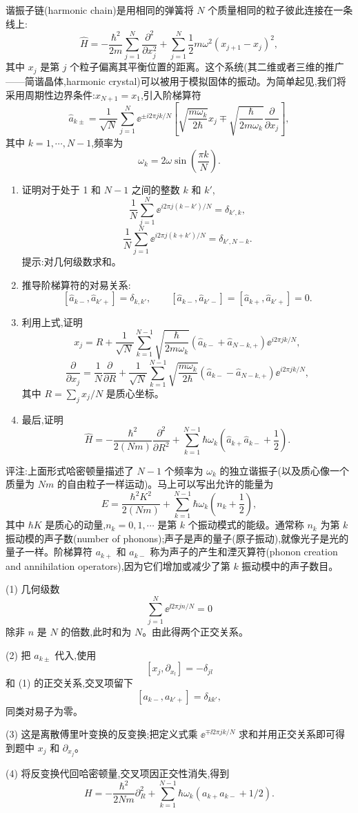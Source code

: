 \begin{question}
谐振子链(harmonic chain)是用相同的弹簧将 $N$ 个质量相同的粒子彼此连接在一条线上:
\[
\hat H=-\frac{\hbar^2}{2m}\sum_{j=1}^{N}\frac{\partial^2}{\partial x_j^2}
+\sum_{j=1}^{N}\frac12 m\omega^2(x_{j+1}-x_j)^2,
\]
其中 $x_j$ 是第 $j$ 个粒子偏离其平衡位置的距离。这个系统(其二维或者三维的推广——简谐晶体,harmonic crystal)可以被用于模拟固体的振动。为简单起见,我们将采用周期性边界条件:$x_{N+1}=x_1$,引入阶梯算符
\[
\hat a_{k\pm}=\frac{1}{\sqrt N}\sum_{j=1}^{N}\ee^{\pm i2\pi jk/N}\left[\sqrt{\frac{m\omega_k}{2\hbar}}x_j\mp\sqrt{\frac{\hbar}{2m\omega_k}}\frac{\partial}{\partial x_j}\right],
\]
其中 $k=1,\cdots,N-1$,频率为
\[
\omega_k=2\omega\sin\left(\frac{\pi k}{N}\right).
\]
\begin{enumerate}
\item 证明对于处于 1 和 $N-1$ 之间的整数 $k$ 和 $k'$,
\[
\frac{1}{N}\sum_{j=1}^{N}\ee^{i2\pi j(k-k')/N}=\delta_{k',k},
\]
\[
\frac{1}{N}\sum_{j=1}^{N}\ee^{i2\pi j(k+k')/N}=\delta_{k',N-k}.
\]
提示:对几何级数求和。
\item 推导阶梯算符的对易关系:
\[
[\hat a_{k-},\hat a_{k'+}]=\delta_{k,k'},\qquad
[\hat a_{k-},\hat a_{k'-}]=[\hat a_{k+},\hat a_{k'+}]=0.
\]
\item 利用上式,证明
\[
x_j=R+\frac{1}{\sqrt N}\sum_{k=1}^{N-1}\sqrt{\frac{\hbar}{2m\omega_k}}(\hat a_{k-}+\hat a_{N-k,+})\ee^{i2\pi jk/N},
\]
\[
\frac{\partial}{\partial x_j}=\frac{1}{N}\frac{\partial}{\partial R}+\frac{1}{\sqrt N}\sum_{k=1}^{N-1}\sqrt{\frac{m\omega_k}{2\hbar}}(\hat a_{k-}-\hat a_{N-k,+})\ee^{i2\pi jk/N},
\]
其中 $R=\sum_j x_j/N$ 是质心坐标。
\item 最后,证明
\[
\hat H=-\frac{\hbar^2}{2(Nm)}\frac{\partial^2}{\partial R^2}+\sum_{k=1}^{N-1}\hbar\omega_k\left(\hat a_{k+}\hat a_{k-}+\frac12\right).
\]
\end{enumerate}
评注:上面形式哈密顿量描述了 $N-1$ 个频率为 $\omega_k$ 的独立谐振子(以及质心像一个质量为 $Nm$ 的自由粒子一样运动)。马上可以写出允许的能量为
\[
E=\frac{\hbar^2K^2}{2(Nm)}+\sum_{k=1}^{N-1}\hbar\omega_k\left(n_k+\frac12\right),
\]
其中 $\hbar K$ 是质心的动量,$n_k=0,1,\cdots$ 是第 $k$ 个振动模式的能级。通常称 $n_k$ 为第 $k$ 振动模的声子数(number of phonons);声子是声的量子(原子振动),就像光子是光的量子一样。阶梯算符 $a_{k+}$ 和 $a_{k-}$ 称为声子的产生和湮灭算符(phonon creation and annihilation operators),因为它们增加或减少了第 $k$ 振动模中的声子数目。
\begin{solution}

(1) 几何级数
\[
\sum_{j=1}^N\ee^{\ii2\pi jn/N}=0
\]
除非 $n$ 是 $N$ 的倍数,此时和为 $N$。由此得两个正交关系。

(2) 把 $a_{k\pm}$ 代入,使用
\[
[x_j,\partial_{x_l}]=-\delta_{jl}
\]
和 (1) 的正交关系,交叉项留下
\[
[a_{k-},a_{k'+}]=\delta_{kk'},
\]
同类对易子为零。

(3) 这是离散傅里叶变换的反变换;把定义式乘 $\ee^{\mp\ii2\pi jk/N}$ 求和并用正交关系即可得到题中 $x_j$ 和 $\partial_{x_j}$。

(4) 将反变换代回哈密顿量,交叉项因正交性消失,得到
\[
H=-\frac{\hbar^2}{2Nm}\partial_R^2+
\sum_{k=1}^{N-1}\hbar\omega_k(a_{k+}a_{k-}+1/2).
\]

\end{solution}
\end{question}

